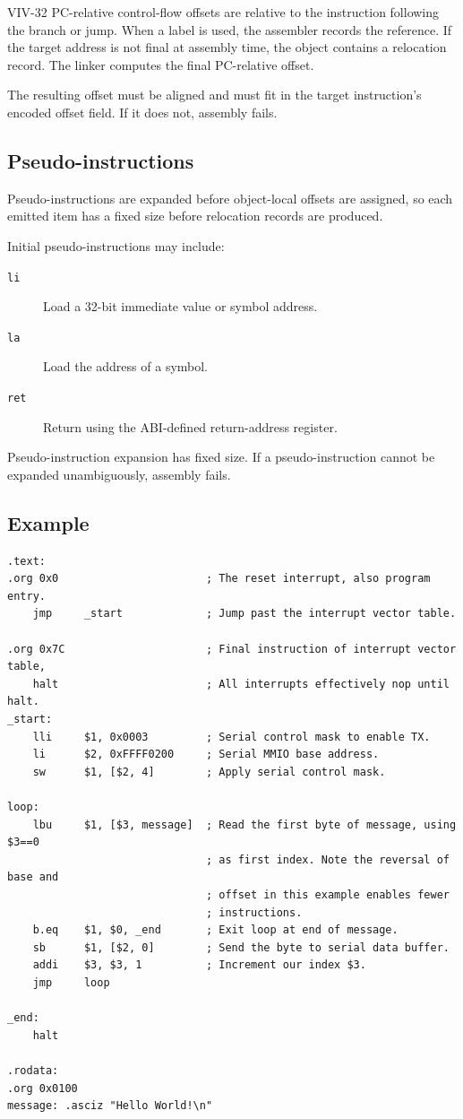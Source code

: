 VIV-32 PC-relative control-flow offsets are relative to the instruction following the
branch or jump.
When a label is used, the assembler records the reference. If the target address is not
final at assembly time, the object contains a relocation record. The linker computes the
final PC-relative offset.

The resulting offset must be aligned and must fit in the target instruction's encoded
offset field. If it does not, assembly fails.

\subsection{Pseudo-instructions}

Pseudo-instructions are expanded before object-local offsets are assigned, so each
emitted item has a fixed size before relocation records are produced.

Initial pseudo-instructions may include:

\begin{description}
    \item[\texttt{li}] Load a 32-bit immediate value or symbol address.
    \item[\texttt{la}] Load the address of a symbol.
    \item[\texttt{ret}] Return using the ABI-defined return-address register.
\end{description}

Pseudo-instruction expansion has fixed size. If a pseudo-instruction cannot be expanded
unambiguously, assembly fails.

\subsection{Example}

\begin{verbatim}
.text:
.org 0x0                       ; The reset interrupt, also program entry.
    jmp     _start             ; Jump past the interrupt vector table.

.org 0x7C                      ; Final instruction of interrupt vector table,
    halt                       ; All interrupts effectively nop until halt.
_start:
    lli     $1, 0x0003         ; Serial control mask to enable TX.
    li      $2, 0xFFFF0200     ; Serial MMIO base address.
    sw      $1, [$2, 4]        ; Apply serial control mask.

loop:
    lbu     $1, [$3, message]  ; Read the first byte of message, using $3==0
                               ; as first index. Note the reversal of base and
                               ; offset in this example enables fewer
                               ; instructions.
    b.eq    $1, $0, _end       ; Exit loop at end of message.
    sb      $1, [$2, 0]        ; Send the byte to serial data buffer.
    addi    $3, $3, 1          ; Increment our index $3.
    jmp     loop

_end:
    halt

.rodata:
.org 0x0100
message: .asciz "Hello World!\n"
\end{verbatim}
